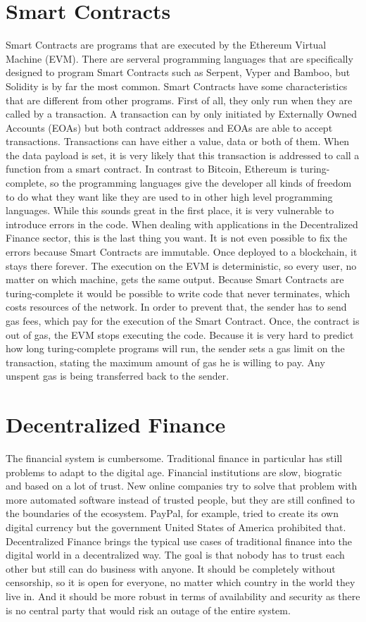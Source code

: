\section{Smart Contracts}
Smart Contracts are programs that are executed by the Ethereum Virtual Machine (EVM). There are serveral programming languages that are specifically designed to
program Smart Contracts such as Serpent, Vyper and Bamboo, but Solidity is by far the most common. Smart Contracts have some characteristics that are different from
other programs. First of all, they only run when they are called by a transaction. A transaction can by only initiated by Externally Owned Accounts (EOAs) but both
contract addresses and EOAs are able to accept transactions. Transactions can have either a value, data or both of them. When the data payload is set, it is very
likely that this transaction is addressed to call a function from a smart contract. In contrast to Bitcoin, Ethereum is turing-complete, so the programming languages
give the developer all kinds of freedom to do what they want like they are used to in other high level programming languages. While this sounds great in the first
place, it is very vulnerable to introduce errors in the code. When dealing with applications in the Decentralized Finance sector, this is the last thing you want.
It is not even possible to fix the errors because Smart Contracts are immutable. Once deployed to a blockchain, it stays there forever. The execution on the EVM
is deterministic, so every user, no matter on which machine, gets the same output. Because Smart Contracts are turing-complete it would be possible to write code
that never terminates, which costs resources of the network. In order to prevent that, the sender has to send gas fees, which pay for the execution of the Smart
Contract. Once, the contract is out of gas, the EVM stops executing the code. Because it is very hard to predict how long turing-complete programs will run, the sender
sets a gas limit on the transaction, stating the maximum amount of gas he is willing to pay. Any unspent gas is being transferred back to the sender.

\section{Decentralized Finance}
The financial system is cumbersome. Traditional finance in particular has still problems to adapt to the digital age. Financial institutions are slow, biogratic
and based on a lot of trust. New online companies try to solve that problem with more automated software instead of trusted people, but they are still confined
to the boundaries of the ecosystem. PayPal, for example, tried to create its own digital currency but the government United States of America prohibited that.
Decentralized Finance brings the typical use cases of traditional finance into the digital world in a decentralized way. The goal is that nobody has to trust each
other but still can do business with anyone. It should be completely without censorship, so it is open for everyone, no matter which country in the world they live
in. And it should be more robust in terms of availability and security as there is no central party that would risk an outage of the entire system.

